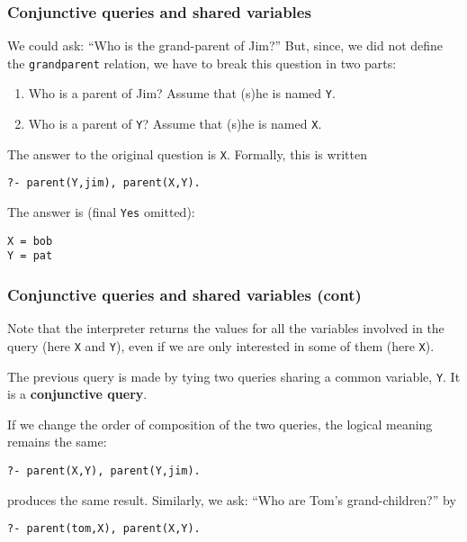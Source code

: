 %
\begin{frame}[containsverbatim]
\frametitle{Conjunctive queries and shared variables}

We could ask: ``Who is the grand-parent of Jim?'' But, since, we did
not define the \texttt{grandparent} relation, we have to break this
question in two parts:
\begin{enumerate}

  \item Who is a parent of Jim? Assume that (s)he is named \texttt{Y}.

  \item Who is a parent of \texttt{Y}? Assume that (s)he is named
    \texttt{X}.

\end{enumerate}
The answer to the original question is \texttt{X}. Formally, this is
written
{\small
\begin{verbatim}
?- parent(Y,jim), parent(X,Y).
\end{verbatim}
}
The answer is (final \texttt{Yes} omitted):
{\small
\begin{verbatim}
X = bob
Y = pat
\end{verbatim}
}

\end{frame}

%
\begin{frame}[containsverbatim]
\frametitle{Conjunctive queries and shared variables (cont)}

Note that the \Prolog interpreter returns the values for all the
variables involved in the query (here \texttt{X} and \texttt{Y}), even
if we are only interested in some of them (here \texttt{X}).

\bigskip

The previous query is made by tying two queries sharing a common
variable, \texttt{Y}. It is a \textbf{conjunctive query}.

\bigskip

If we change the order of composition of the two queries, the logical
meaning remains the same:
{\small
\begin{verbatim}
?- parent(X,Y), parent(Y,jim).
\end{verbatim}
}
\noindent produces the same result. Similarly, we ask: ``Who are Tom's
grand-children?'' by
{\small
\begin{verbatim}
?- parent(tom,X), parent(X,Y).
\end{verbatim}
}

\end{frame}

